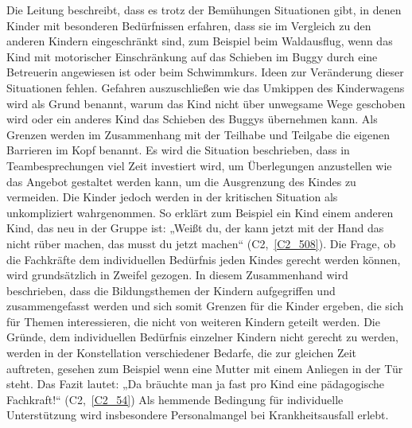 Die Leitung beschreibt, dass es trotz der Bemühungen Situationen gibt, in denen Kinder mit besonderen Bedürfnissen erfahren, dass sie im Vergleich zu den anderen Kindern eingeschränkt sind, zum Beispiel beim Waldausflug, wenn das Kind mit motorischer Einschränkung auf das Schieben im Buggy durch eine Betreuerin angewiesen ist oder beim Schwimmkurs. Ideen zur Veränderung dieser Situationen fehlen. Gefahren auszuschließen wie das Umkippen des Kinderwagens wird als Grund benannt, warum das Kind nicht über unwegsame Wege geschoben wird oder ein anderes Kind das Schieben des Buggys übernehmen kann. Als Grenzen werden im Zusammenhang mit der Teilhabe und Teilgabe die eigenen Barrieren im Kopf benannt. Es wird die Situation beschrieben, dass in Teambesprechungen viel Zeit investiert wird, um Überlegungen anzustellen wie das Angebot gestaltet werden kann, um die Ausgrenzung des Kindes zu vermeiden. Die Kinder jedoch werden in der kritischen Situation als unkompliziert wahrgenommen. So erklärt zum Beispiel ein Kind einem anderen Kind, das neu in der Gruppe ist: „Weißt du, der kann jetzt mit der Hand das nicht rüber machen, das musst du jetzt machen“ (C2,~\ref{C2_508}).
Die Frage, ob die Fachkräfte dem individuellen Bedürfnis jeden Kindes gerecht werden können, wird grundsätzlich in Zweifel gezogen. In diesem Zusammenhand wird beschrieben, dass die Bildungsthemen der Kindern aufgegriffen und zusammengefasst werden und sich somit Grenzen für die Kinder ergeben, die sich für Themen interessieren, die nicht von weiteren Kindern geteilt werden. Die Gründe, dem individuellen Bedürfnis einzelner Kindern nicht gerecht zu werden, werden in der Konstellation verschiedener Bedarfe, die zur gleichen Zeit auftreten, gesehen zum Beispiel wenn eine Mutter mit einem Anliegen in der Tür steht. Das Fazit lautet: „Da bräuchte man ja fast pro Kind eine pädagogische Fachkraft!“ (C2,~\ref{C2_54}) 
Als hemmende Bedingung für individuelle Unterstützung wird insbesondere Personalmangel bei Krankheitsausfall erlebt.

